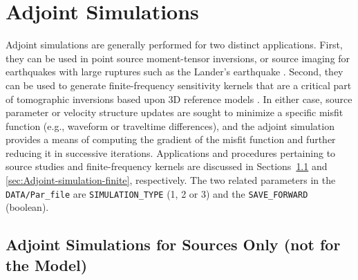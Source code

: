 \chapter{Adjoint Simulations}\label{cha:Adjoint-Simulations}

Adjoint simulations are generally performed for two distinct applications.
First, they can be used in point source moment-tensor inversions, or source imaging for
earthquakes with large ruptures such as the Lander's earthquake \citep{WaHe94}.
Second, they can be used to generate finite-frequency sensitivity
kernels that are a critical part of tomographic inversions based upon
3D reference models \citep{TrTaLi05,LiTr06,TrKoLi08,LiTr08}. In either
case, source parameter or velocity structure updates are sought to
minimize a specific misfit function (e.g., waveform or traveltime
differences), and the adjoint simulation provides a means of computing
the gradient of the misfit function and further reducing it in successive
iterations. Applications and procedures pertaining to source studies
and finite-frequency kernels are discussed in Sections~\ref{sec:Adjoint-simulation-sources}
and \ref{sec:Adjoint-simulation-finite}, respectively. The two related
parameters in the \texttt{DATA/Par\_file} are \texttt{SIMULATION\_TYPE}
(1, 2 or 3) and the \texttt{SAVE\_FORWARD} (boolean).


\section{Adjoint Simulations for Sources Only (not for the Model)}\label{sec:Adjoint-simulation-sources}

